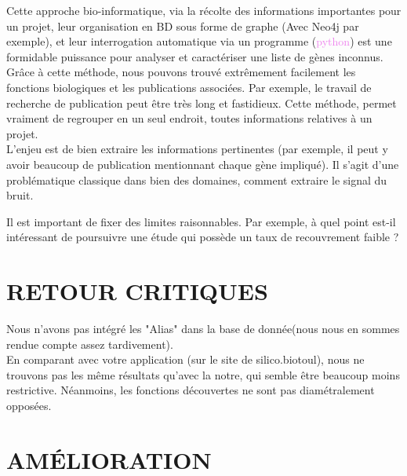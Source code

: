 \documentclass[a4paper,11pt,openright]{report}
\begin{document}
Cette approche bio-informatique, via la récolte des informations importantes pour un projet, leur organisation en BD sous forme de graphe (Avec Neo4j par exemple), et leur interrogation automatique via un programme (\textcolor{violet}{python}) est une formidable puissance pour analyser et caractériser une liste de gènes inconnus. Grâce à cette méthode, nous pouvons trouvé extrêmement facilement les fonctions biologiques et les publications associées. Par exemple, le travail de recherche de publication peut être très long et fastidieux. Cette méthode, permet vraiment de regrouper en un seul endroit, toutes informations relatives à un projet. \\ 
L'enjeu est de bien extraire les informations pertinentes (par exemple, il peut y avoir beaucoup de publication mentionnant chaque gène impliqué). Il s'agit d'une problématique classique dans bien des domaines, comment extraire le signal du bruit.

Il est important de fixer des limites raisonnables. Par exemple, à quel point est-il intéressant de poursuivre une étude qui possède un taux de recouvrement faible ?

\section{RETOUR CRITIQUES}

Nous n'avons pas intégré les "Alias" dans la base de donnée(nous nous en sommes rendue compte assez tardivement). \\
En comparant avec votre application (sur le site de silico.biotoul), nous ne trouvons pas les même résultats qu'avec la notre, qui semble être beaucoup moins restrictive. Néanmoins, les fonctions découvertes ne sont pas diamétralement opposées. \\

\section{AMÉLIORATION}
\end{document}
